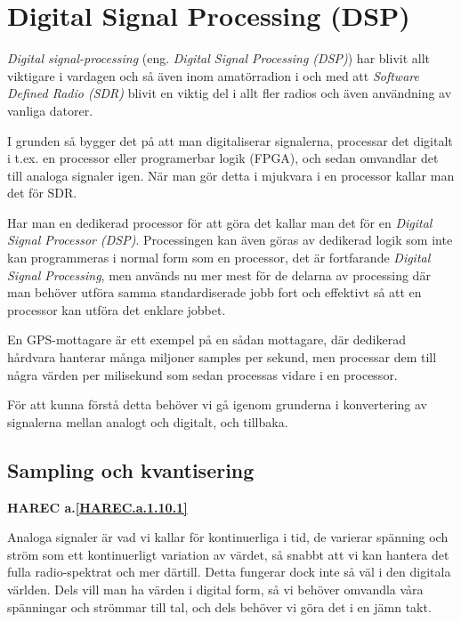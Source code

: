 \section{Digital Signal Processing (DSP)}

\emph{Digital signal-processing} (eng. \emph{Digital Signal Processing (DSP)})
har blivit allt viktigare i vardagen och så även inom amatörradion i och med
att \emph{Software Defined Radio (SDR)} blivit en viktig del i allt fler
radios och även användning av vanliga datorer.

I grunden så bygger det på att man digitaliserar signalerna, processar det
digitalt i t.ex. en processor eller programerbar logik (FPGA), och sedan
omvandlar det till analoga signaler igen. När man gör detta i mjukvara i en
processor kallar man det för SDR.

Har man en dedikerad processor för att göra det kallar man det för en
\emph{Digital Signal Processor (DSP)}. Processingen kan även göras av dedikerad
logik som inte kan programmeras i normal form som en processor, det är
fortfarande \emph{Digital Signal Processing}, men används
nu mer mest för de delarna av processing där man behöver utföra samma
standardiserade jobb fort och effektivt så att en processor kan utföra det
enklare jobbet.

En GPS-mottagare är ett exempel på en sådan mottagare, där dedikerad hårdvara
hanterar många miljoner samples per sekund, men processar dem till några värden
per milisekund som sedan processas vidare i en processor.

För att kunna förstå detta behöver vi gå igenom grunderna i konvertering av
signalerna mellan analogt och digitalt, och tillbaka.

\subsection{Sampling och kvantisering}
\textbf{HAREC a.\ref{HAREC.a.1.10.1}\label{myHAREC.a.1.10.1}}

Analoga signaler är vad vi kallar för kontinuerliga i tid, de varierar spänning
och ström som ett kontinuerligt variation av värdet, så snabbt att vi kan
hantera det fulla radio-spektrat och mer därtill. Detta fungerar dock inte så
väl i den digitala världen. Dels vill man ha värden i digital form, så vi
behöver omvandla våra spänningar och strömmar till tal, och dels behöver vi
göra det i en jämn takt.

